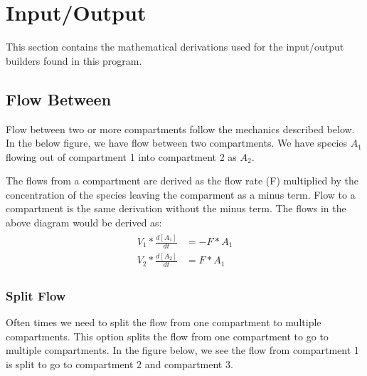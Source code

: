 \documentclass[letterpaper,10pt,english]{sphinxmanual}
\let\sphinxpxdimen\pdfpxdimen\else\newdimen\sphinxpxdimen
\begin{document}
\section{Input/Output}
\label{\detokenize{pages/backend/inputOutput_index:input-output}}\label{\detokenize{pages/backend/inputOutput_index::doc}}
\sphinxAtStartPar
This section contains the mathematical derivations used for the input/output
builders found in this program.


\subsection{Flow Between}
\label{\detokenize{pages/backend/io_info/1_flow_between:flow-between}}\label{\detokenize{pages/backend/io_info/1_flow_between::doc}}
\sphinxAtStartPar
Flow between two or more compartments follow the mechanics described below. In
the below figure, we have flow between two compartments. We have species
\(A_1\) flowing out of compartment 1 into compartment 2 as \(A_2\).

\begin{figure}[htbp]
\centering

\noindent\sphinxincludegraphics[width=400\sphinxpxdimen,height=300\sphinxpxdimen]{{flow_between}.png}
\end{figure}

\sphinxAtStartPar
The flows from a compartment are derived as the flow rate (F) multiplied by the
concentration of the species leaving the comparment as a minus term.
Flow to a compartment is the same derivation without the minus term.
The flows in the above diagram would be derived as:
\begin{equation*}
\begin{split}\begin{align*}
    V_1 * \frac{d[A_1]}{dt} &= -F * A_{1} \\
    V_2 * \frac{d[A_2]}{dt} &= F * A_{1}
\end{align*}\end{split}
\end{equation*}

\subsubsection{Split Flow}
\label{\detokenize{pages/backend/io_info/1_flow_between:split-flow}}
\sphinxAtStartPar
Often times we need to split the flow from one compartment to multiple
compartments.  This option splits the flow from one compartment to go to
multiple compartments. In the figure below, we see the flow from compartment 1
is split to go to compartment 2 and compartment 3.
\end{document}
